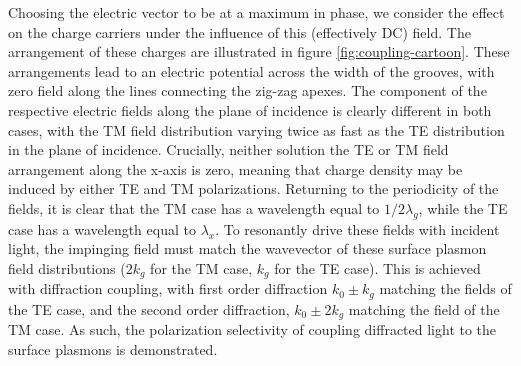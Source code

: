 \documentclass[oneside,11pt,book]{book}
\begin{document}
Choosing the electric vector to be at a maximum in phase, we consider the effect on the charge carriers under the influence of this (effectively DC) field. The arrangement of these charges are illustrated in figure \ref{fig:coupling-cartoon}. These arrangements lead to an electric potential across the width of the grooves, with zero field along the lines connecting the zig-zag apexes. The component of the respective electric fields along the plane of incidence is clearly different in both cases, with the TM field distribution varying twice as fast as the TE distribution in the plane of incidence. Crucially, neither solution the TE or TM field arrangement along the x-axis is zero, meaning that charge density may be induced by either TE and TM polarizations. Returning to the periodicity of the fields, it is clear that the TM case has a wavelength equal to $1/2 \lambda_g$, while the TE case has a wavelength equal to $\lambda_x$. To resonantly drive these fields with incident light, the impinging field must match the wavevector of these surface plasmon field distributions ($2k_g$ for the TM case, $k_g$ for the TE case). This is achieved with diffraction coupling, with first order diffraction $k_0\pm k_g$ matching the fields of the TE case, and the second order diffraction, $k_0 \pm 2k_g$ matching the field of the TM case. As such, the polarization selectivity of coupling diffracted light to the surface plasmons is demonstrated.
\end{document}
